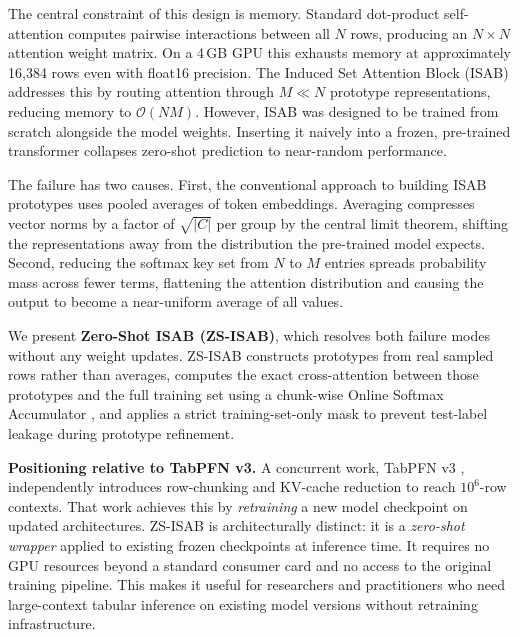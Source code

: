 \documentclass{article}
\begin{document}
The central constraint of this design is memory. Standard dot-product self-attention \citep{vaswani2017attention} computes pairwise interactions between all $N$ rows, producing an $N \times N$ attention weight matrix. On a 4\,GB GPU this exhausts memory at approximately 16{,}384 rows even with float16 precision. The Induced Set Attention Block (ISAB) \citep{lee2019set} addresses this by routing attention through $M \ll N$ prototype representations, reducing memory to $\mathcal{O}(NM)$. However, ISAB was designed to be trained from scratch alongside the model weights. Inserting it naively into a frozen, pre-trained transformer collapses zero-shot prediction to near-random performance.

The failure has two causes. First, the conventional approach to building ISAB prototypes uses pooled averages of token embeddings. Averaging compresses vector norms by a factor of $\sqrt{|C|}$ per group by the central limit theorem, shifting the representations away from the distribution the pre-trained model expects. Second, reducing the softmax key set from $N$ to $M$ entries spreads probability mass across fewer terms, flattening the attention distribution and causing the output to become a near-uniform average of all values.

We present \textbf{Zero-Shot ISAB (ZS-ISAB)}, which resolves both failure modes without any weight updates. ZS-ISAB constructs prototypes from real sampled rows rather than averages, computes the exact cross-attention between those prototypes and the full training set using a chunk-wise Online Softmax Accumulator \citep{milakov2018online}, and applies a strict training-set-only mask to prevent test-label leakage during prototype refinement.

\textbf{Positioning relative to TabPFN v3.} A concurrent work, TabPFN v3 \citep{hollmann2025tabpfn3}, independently introduces row-chunking and KV-cache reduction to reach $10^6$-row contexts. That work achieves this by \emph{retraining} a new model checkpoint on updated architectures. ZS-ISAB is architecturally distinct: it is a \emph{zero-shot wrapper} applied to existing frozen checkpoints at inference time. It requires no GPU resources beyond a standard consumer card and no access to the original training pipeline. This makes it useful for researchers and practitioners who need large-context tabular inference on existing model versions without retraining infrastructure.
\end{document}
